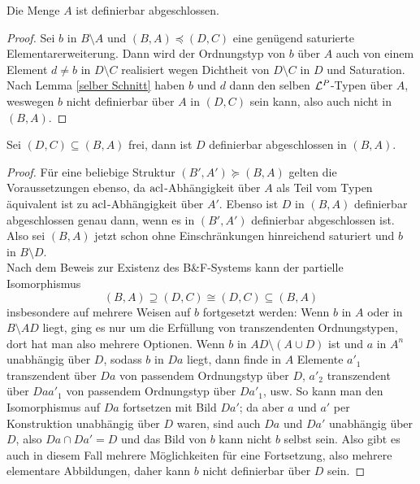 \begin{lemma}\label{A definierbar abgeschl}
	Die Menge $A$ ist definierbar abgeschlossen.
\end{lemma}
\begin{proof}
	Sei $b$ in $B\setminus A$ und $(B,A)\preceq(D,C)$ eine genügend saturierte Elementarerweiterung. Dann wird der Ordnungstyp von $b$ über $A$ auch von einem Element $d\neq b$ in $D\setminus C$ realisiert wegen Dichtheit von $D\setminus C$ in $D$ und Saturation.\\
	Nach Lemma \ref{selber Schnitt} haben $b$ und $d$ dann den selben $\mathcal{L}^P$-Typen über $A$, weswegen $b$ nicht definierbar über $A$ in $(D,C)$ sein kann, also auch nicht in $(B,A)$.
\end{proof}

\begin{lemma}\label{Freie Definierbarkeit}
	Sei $(D,C)\subseteq(B,A)$ frei, dann ist $D$ definierbar abgeschlossen in $(B,A)$.
\end{lemma}
\begin{proof}
	Für eine beliebige Struktur $(B',A')\succeq (B,A)$ gelten die Voraussetzungen ebenso, da $\operatorname{acl}$-Abhängigkeit über $A$ als Teil vom Typen äquivalent ist zu $\operatorname{acl}$-Abhängigkeit über $A'$. Ebenso ist $D$ in $(B,A)$ definierbar abgeschlossen genau dann, wenn es in $(B',A')$ definierbar abgeschlossen ist. Also sei $(B,A)$ jetzt schon ohne Einschränkungen hinreichend saturiert und $b$ in $B\setminus D$.\\
	Nach dem Beweis zur Existenz des B\&F-Systems kann der partielle Isomorphismus $$(B,A)\supseteq(D,C)\cong(D,C)\subseteq(B,A)$$ insbesondere auf mehrere Weisen auf $b$ fortgesetzt werden: Wenn $b$ in $A$ oder in $B\setminus AD$ liegt, ging es nur um die Erfüllung von transzendenten Ordnungstypen, dort hat man also mehrere Optionen. Wenn $b$ in $AD\setminus(A\cup D)$ ist und $a$ in $A^n$ unabhängig über $D$, sodass $b$ in $Da$ liegt, dann finde in $A$ Elemente $a'_1$ transzendent über $Da$ von passendem Ordnungstyp über $D$, $a'_2$ transzendent über $Daa'_1$ von passendem Ordnungstyp über $Da'_1$, usw.\newpage
	So kann man den Isomorphismus auf $Da$ fortsetzen mit Bild $Da'$; da aber $a$ und $a'$ per Konstruktion unabhängig über $D$ waren, sind auch $Da$ und $Da'$ unabhängig über $D$, also $Da\cap Da'=D$ und das Bild von $b$ kann nicht $b$ selbst sein. Also gibt es auch in diesem Fall mehrere Möglichkeiten für eine Fortsetzung, also mehrere elementare Abbildungen, daher kann $b$ nicht definierbar über $D$ sein.
\end{proof}

